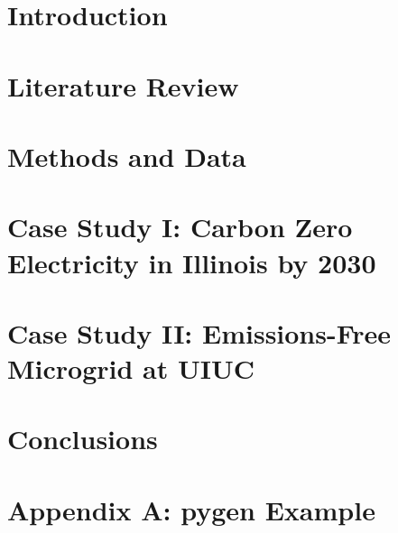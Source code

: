 \documentclass[edeposit,fullpage,11pt]{uiucthesis2018}
\begin{document}
%
%
\tableofcontents
\listoftables
\listoffigures
%

%
\pagebreak
\mainmatter
%

\glsresetall
\chapter{Introduction}

%
\chapter{Literature Review}

\label{chapter:litrev}

\chapter{Methods and Data}
\label{chapter:methods}


\chapter{Case Study I: Carbon Zero Electricity in Illinois by 2030}
\label{chapter:illinois}


 \chapter{Case Study II: Emissions-Free Microgrid at UIUC}
\label{chapter:uiuc}


\chapter{Conclusions}


\backmatter



%
\appendix
{}
\chapter*{Appendix A: \gls{pygen} Example}

%
\end{document}
